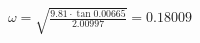 \documentclass[preview]{standalone}
\begin{document}
\begin{align*}
\omega=\sqrt{\frac{9.81\cdot\tan{0.00665}}{2.00997}}=0.18009
\end{align*}
\end{document}
